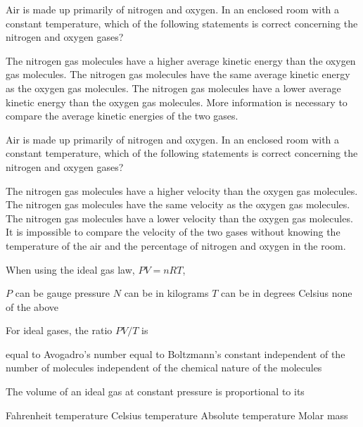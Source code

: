 \documentclass{../../../oss-ap12ibhl-print}
\begin{document}
\genheader


\begin{questions}
  \question Air is made up primarily of nitrogen and oxygen. In an enclosed room
  with a constant temperature, which of the following statements is
  correct concerning the nitrogen and oxygen gases?
  \begin{choices}
    \choice The nitrogen gas molecules have a higher average kinetic energy than
    the oxygen gas molecules.
    \choice The nitrogen gas molecules have the same average kinetic energy as
    the oxygen gas molecules.
    \choice The nitrogen gas molecules have a lower average kinetic energy than
    the oxygen gas molecules.
    \choice More information is necessary to compare the average kinetic
    energies of the two gases.
  \end{choices}
    
  \question Air is made up primarily of nitrogen and oxygen. In an enclosed room
  with a constant temperature, which of the following statements is correct
  concerning the nitrogen and oxygen gases?
  \begin{choices}
    \choice The nitrogen gas molecules have a higher velocity than the oxygen
    gas molecules.
    \choice The nitrogen gas molecules have the same velocity as the oxygen gas
    molecules.
    \choice The nitrogen gas molecules have a lower velocity than the oxygen gas
    molecules.
    \choice It is impossible to compare the velocity of the two gases without
    knowing the temperature of the air and the percentage of nitrogen and
    oxygen in the room.
  \end{choices}
    
  \question When using the ideal gas law, $PV=nRT$,
  \begin{choices}
    \choice $P$ can be gauge pressure
    \choice $N$ can be in kilograms
    \choice $T$ can be in degrees Celsius
    \choice none of the above
  \end{choices}

  \question For ideal gases, the ratio $PV/T $ is
  \begin{choices}
    \choice equal to Avogadro's number
    \choice equal to Boltzmann's constant
    \choice independent of the number of molecules
    \choice independent of the chemical nature of the molecules
  \end{choices}

  \question The volume of an ideal gas at constant pressure is proportional to
  its
  \begin{choices}
    \choice Fahrenheit temperature
    \choice Celsius temperature
    \choice Absolute temperature
    \choice Molar mass
  \end{choices}
    

\end{questions}
\end{document}
